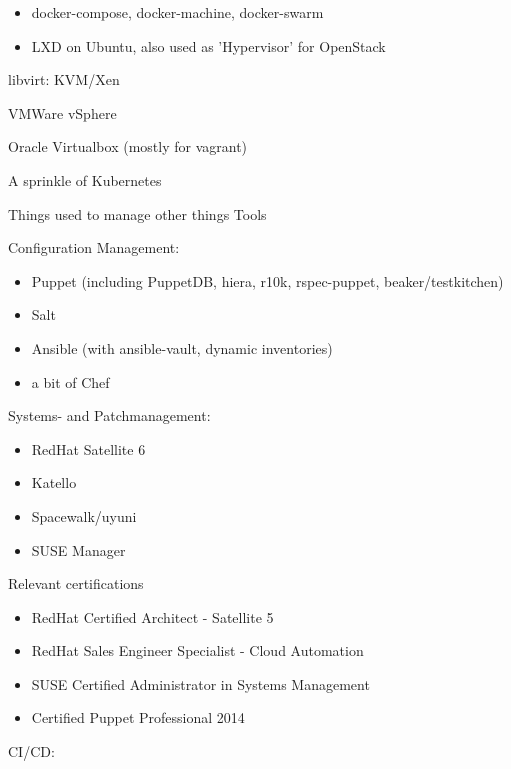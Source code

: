 \begin{cventries}
{\begin{cvitems}
          \begin{itemize}
            \item docker-compose, docker-machine, docker-swarm
            \item LXD on Ubuntu, also used as 'Hypervisor' for OpenStack
          \end{itemize}
        \item libvirt: KVM/Xen
        \item VMWare vSphere
        \item Oracle Virtualbox (mostly for vagrant)
        \item A sprinkle of Kubernetes
      \end{cvitems}
    }
  \cventry
    {Things used to manage other things}
    {Tools}
    {}
    {}
    {
      \begin{cvitems}
        \item Configuration Management:
          \begin{itemize}
            \item Puppet (including PuppetDB, hiera, r10k, rspec-puppet, beaker/testkitchen)
            \item Salt
            \item Ansible (with ansible-vault, dynamic inventories)
            \item a bit of Chef
          \end{itemize}
        \item Systems- and Patchmanagement:
        \begin{itemize}
          \item RedHat Satellite 6
          \item Katello
          \item Spacewalk/uyuni
          \item SUSE Manager
        \end{itemize}
        \item Relevant certifications
          \begin{itemize}
            \item RedHat Certified Architect - Satellite 5
            \item RedHat Sales Engineer Specialist - Cloud Automation
            \item SUSE Certified Administrator in Systems Management
            \item Certified Puppet Professional 2014
          \end{itemize}
      \item CI/CD:

\end{cvitems}}
\end{cventries}
